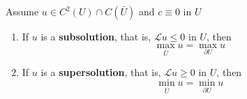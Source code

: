 \begin{theorem}
    \label{thm: Weak maximum principle}
    Assume $u \in C^2(U) \cap C(\bar{U})$ and
    $ c \equiv 0 $ in $U$
    \begin{enumerate}
        \item
              If $u$ is a \textbf{subsolution}, that is,
              $\mathcal{L}u \leq 0$ in $U$, then
              \begin{equation*}
                  \max_{\bar{U}} u=\max _{\partial U} u
              \end{equation*}
        \item
              If $u$ is a \textbf{supersolution}, that is, $\mathcal{L}u \geq 0$ in $U$, then
              \begin{equation*}
                  \min _{\bar{U}} u=\min _{\partial U} u
              \end{equation*}
    \end{enumerate}
\end{theorem}

